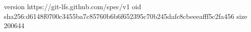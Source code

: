 version https://git-lfs.github.com/spec/v1
oid sha256:d6148f0700c3455ba7c85760b6b6f652395c70b245dafc8cbeeeafff5c2fa456
size 200644
